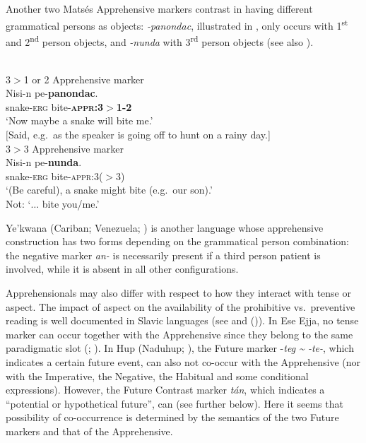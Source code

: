 \documentclass[output=paper,colorlinks,citecolor=brown
]{langscibook}
\begin{document}
 Another two Matsés Apprehensive markers contrast in having different grammatical persons as objects: \textit{-panondac}, illustrated in , only occurs with 1\textsuperscript{st} and 2\textsuperscript{nd} person objects, and \textit{-nunda} with 3\textsuperscript{rd} person objects (see also ).

\newpage
\ea \label{ex:intro12} 
\\
\ea \label{ex:intro12a} \textnormal{3$>$1 or 2 Apprehensive marker} \\
\gll Nisi-n pe-\textbf{panondac}. \\
snake-\textsc{erg} bite-\textsc{\textbf{appr:3$>$1-2}} \\
\glt `Now maybe a snake will bite me.' \\
$[$Said, e.g.\  as the speaker is going off to hunt on a rainy day.] \\
\ex \label{ex:intro12b} \textnormal{3$>$3 Apprehensive marker} \\
\gll Nisi-n pe-\textbf{nunda}. \\
snake-\textsc{erg} bite-\textsc{appr:3($>$3)} \\
\glt `(Be careful), a snake might bite (e.g.\  our son).'
\\
Not: `$\ldots$ bite you/me.'
\z
\z

Ye'kwana (Cariban; Venezuela; \cite[232--233]{caceres}) is another language whose apprehensive construction has two forms depending on the grammatical person combination: the negative marker \textit{an-} is necessarily present if a third person patient is involved, while it is absent in all other configurations.

Apprehensionals may also differ with respect to how they interact with tense or aspect. The impact of aspect on the availability of the prohibitive vs.\ preventive reading is well documented in Slavic languages (see  and (\citealt{chapters/wiemer})). In Ese Ejja, no tense marker can occur together with the Apprehensive since they belong to the same paradigmatic slot (\cite[367, 449]{vuillermet2012}; \cite[268]{vuillermet2018a}). In Hup (Naduhup; \cite[607--608]{epps2008}), the Future marker \nobreakdash-\textit{teg \~{ } \nobreakdash-te-}, which indicates a certain future event, can also not co-occur with the Apprehensive (nor with the Imperative, the Negative, the Habitual and some conditional expressions). However, the Future Contrast marker \textit{tán}, which indicates a ``potential or hypothetical future'', can (see  further below). Here it seems that possibility of co-occurrence is determined by the semantics of the two Future markers and that of the Apprehensive. 
\end{document}
